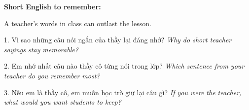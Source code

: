 \begin{ghinhoanh}
\textbf{Short English to remember:}

A teacher's words in class can outlast the lesson.

\end{ghinhoanh}

\begin{tuhocnhanh}
1. Vì sao những câu nói ngắn của thầy lại đáng nhớ? \textit{Why do short teacher sayings stay memorable?}

2. Em nhớ nhất câu nào thầy cô từng nói trong lớp? \textit{Which sentence from your teacher do you remember most?}

3. Nếu em là thầy cô, em muốn học trò giữ lại câu gì? \textit{If you were the teacher, what would you want students to keep?}
\end{tuhocnhanh}

\ngancach
